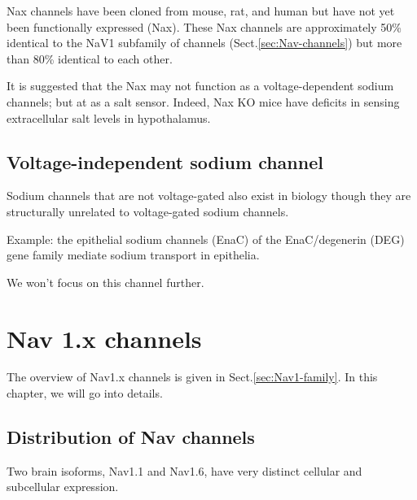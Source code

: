 Nax channels have been cloned from mouse, rat, and human but have not yet been
functionally expressed (Nax). These Nax channels are approximately 50\%
identical to the NaV1 subfamily of channels (Sect.\ref{sec:Nav-channels}) but
more than 80\% identical to each other.

It is suggested that the Nax may not function as a voltage-dependent sodium
channels; but at as a salt sensor. Indeed, Nax KO mice have deficits in sensing
extracellular salt levels in hypothalamus. 

\section{Voltage-independent sodium channel}
\label{sec:Na-channel-voltage-independent}

Sodium channels that are not voltage-gated also exist in biology
though they are structurally unrelated to voltage-gated sodium channels.

Example: the epithelial sodium channels (EnaC) of the EnaC/degenerin (DEG) gene
family mediate sodium transport in epithelia.

We won't focus on this channel further.

\chapter{Nav 1.x channels}
\label{chap:Nav-channels}

The overview of Nav1.x channels is given in Sect.\ref{sec:Nav1-family}.
In this chapter, we will go into details.


\section{Distribution of Nav channels}
\label{sec:Nav-detection-techniques}

Two brain isoforms, Nav1.1 and Nav1.6, have very distinct cellular and
subcellular expression. 

